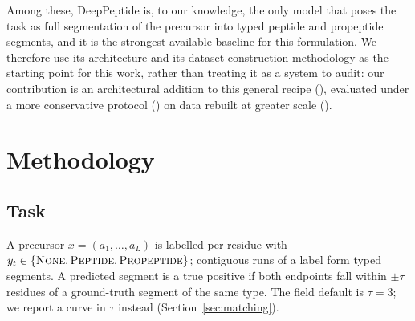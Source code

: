 \documentclass{article}
\begin{document}
Among these, DeepPeptide is, to our knowledge, the only model that poses the task as full segmentation of the precursor into typed peptide and propeptide segments, and it is the strongest available baseline for this formulation. We therefore use its architecture and its dataset-construction methodology as the starting point for this work, rather than treating it as a system to audit: our contribution is an architectural addition to this general recipe (), evaluated under a more conservative protocol () on data rebuilt at greater scale ().

\section{Methodology}
\label{sec:method}

\subsection{Task}
\label{sec:problem}

A precursor $x=(a_1,\dots,a_L)$ is labelled per residue with
$y_t \in \{\textsc{None},\textsc{Peptide},\textsc{Propeptide}\}$; contiguous runs
of a label form typed segments. A predicted segment is a true positive if both
endpoints fall within $\pm\tau$ residues of a ground-truth segment of the same
type. The field default is $\tau=3$; we report a curve in $\tau$ instead
(Section~\ref{sec:matching}).

\end{document}
